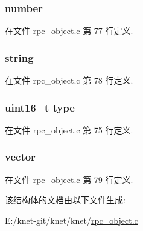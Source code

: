 \subsubsection[{number}]{ number}\label{struct__krpc__object__t_acd272fd951a996ef4a486cc0dc84b479}


在文件 rpc\+\_\+object.\+c 第 77 行定义.

\hypertarget{struct__krpc__object__t_aeac37359c23a46158ff0f269f05ced93}{}
\subsubsection[{string}]{ string}\label{struct__krpc__object__t_aeac37359c23a46158ff0f269f05ced93}


在文件 rpc\+\_\+object.\+c 第 78 行定义.

\hypertarget{struct__krpc__object__t_acb5cfd209ba75c853d03f701e7f91679}{}
\subsubsection[{type}]{\setlength{\rightskip}{0pt plus 5cm}uint16\+\_\+t type}\label{struct__krpc__object__t_acb5cfd209ba75c853d03f701e7f91679}


在文件 rpc\+\_\+object.\+c 第 75 行定义.

\hypertarget{struct__krpc__object__t_afc254d064329050df6ed7d055faaae24}{}
\subsubsection[{vector}]{ vector}\label{struct__krpc__object__t_afc254d064329050df6ed7d055faaae24}


在文件 rpc\+\_\+object.\+c 第 79 行定义.



该结构体的文档由以下文件生成\+:\begin{DoxyCompactItemize}
\item 
E\+:/knet-\/git/knet/knet/\hyperlink{rpc__object_8c}{rpc\+\_\+object.\+c}\end{DoxyCompactItemize}
